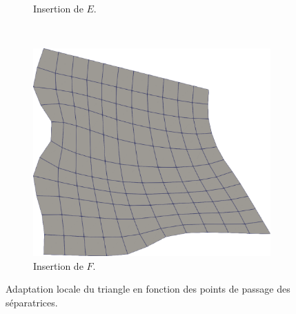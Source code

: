 \begin{figure}[h!]
\begin{subfigure}{0.4\textwidth}
    \caption{Insertion de $E$.}
    \label{fig:transfini_2}
\end{subfigure}
\\[0.5cm]
\begin{subfigure}{0.5\textwidth}
    \includegraphics[width=\textwidth]{images/transfini_3.pdf}
    \caption{Insertion de $F$.}
    \label{fig:transfini_3}
\end{subfigure}
\caption{Adaptation locale du triangle en fonction des points de passage des séparatrices.}
\label{fig:transfini}
\end{figure}

